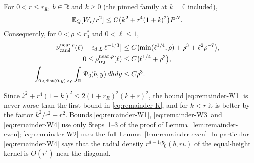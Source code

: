 \begin{lemma}\label{lem:remainder-W}
For $0<r\le r_R$, $b\in\mathbb R$ and $k\ge0$ (the pinned family at $k=0$ included),
\begin{equation}\label{eq:remainder-W1}
\mathbb E_Q[W_r/r^2]\le C\bigl(k^2+r^4(1+k)^2\bigr)P^N .
\end{equation}
Consequently, for $0<\rho\le r_0^*$ and $0<\ell\le1$,
\begin{align}
\bigl|\nu_{\mathrm{cand}}^{\mathrm{near},\rho}(\ell)-c_{d,L}\,\ell^{-1/3}\bigr|&\le C\bigl(\min(\ell^{1/4},\rho)+\rho^3+\ell^2\rho^{-7}\bigr),\label{eq:remainder-W2}\\
0\le\rho_{\mathrm{rej}}^{\mathrm{near},\rho}(\ell)&\le C\bigl(\ell^{1/4}+\rho^3\bigr),\label{eq:remainder-W3}\\
\int_{0<\operatorname{dist}(0,y)<\rho}\int_\mathbb R\Psi_0(b,y)\,db\,dy&\le C\rho^3 .\label{eq:remainder-W4}
\end{align}
\end{lemma}

Since $k^2+r^4(1+k)^2\le2(1+r_R)^2(k+r)^2$, the bound \eqref{eq:remainder-W1} is never worse than the first bound in \eqref{eq:remainder-K}, and for $k<r$ it is better by the factor $k^2/r^2+r^2$. Bounds \eqref{eq:remainder-W1}, \eqref{eq:remainder-W3} and \eqref{eq:remainder-W4} use only Steps~1--3 of the proof of Lemma~\ref{lem:remainder-even}; \eqref{eq:remainder-W2} uses the full Lemma~\ref{lem:remainder-even}. In particular \eqref{eq:remainder-W4} says that the radial density $r^{d-1}\Psi_0(b,ru)$ of the equal-height kernel is $O(r^2)$ near the diagonal.

